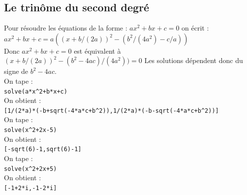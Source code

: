 \documentclass[a4paper,11pt]{book}
\begin{document}
\subsection{Le trin\^ome du second degr\'e}
Pour  r\'esoudre les \'equations de la forme :
$ax^2+bx+c=0$ on \'ecrit :\\
$ax^2+bx+c=a((x+b/(2a))^2-(b^2/(4a^2)-c/a))$\\
Donc $ax^2+bx+c=0$ est \'equivalent \`a $(x+b/(2a))^2-(b^2-4ac)/(4a^2))=0$
Les solutions d\'ependent donc du signe de $b^2-4ac$.\\
On tape :\\
{\tt solve(a*x\verb|^|2+b*x+c)}\\
On obtient :\\
{\tt [1/(2*a)*(-b+sqrt(-4*a*c+b\verb|^|2)),1/(2*a)*(-b-sqrt(-4*a*c+b\verb|^|2))]}\\
On tape :\\
{\tt solve(x\verb|^|2+2x-5)}\\
On obtient :\\
{\tt [-sqrt(6)-1,sqrt(6)-1]}\\
On tape :\\
{\tt solve(x\verb|^|2+2x+5)}\\
On obtient :\\
{\tt [-1+2*i,-1-2*i]}
\end{document}
